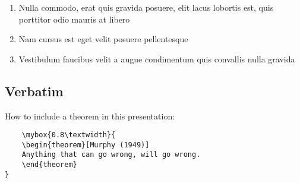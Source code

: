 \begin{enumerate}
    \item Nulla commodo, erat quis gravida posuere, elit lacus lobortis est, quis porttitor odio mauris at libero
    \item Nam cursus est eget velit posuere pellentesque
    \item Vestibulum faucibus velit a augue condimentum quis convallis nulla gravida
\end{enumerate}

\clearpage


\subsection{Verbatim}

How to include a theorem in this presentation:
\begin{verbatim}
    \mybox{0.8\textwidth}{
    \begin{theorem}[Murphy (1949)]
    Anything that can go wrong, will go wrong.
    \end{theorem}
}
\end{verbatim}

\clearpage